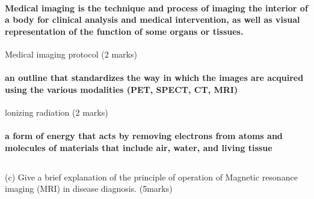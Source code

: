 \documentclass[article]{article}
\begin{document}
\paragraph{Medical imaging is the technique and process of imaging the interior of a body for clinical analysis and medical intervention, as well as visual representation of the function of some organs or tissues. }
Medical imaging protocol (2 marks)
\paragraph{an outline that standardizes the way in which the images are acquired using the various modalities (PET, SPECT, CT, MRI)}
lonizing radiation (2 marks)
\paragraph{ a form of energy that acts by removing electrons from atoms and molecules of materials that include air, water, and living tissue}
\subsection*{}(c) Give a brief explanation of the principle of operation of Magnetic resonance imaging
(MRI) in disease diagnosis. (5marks)
\end{document}
